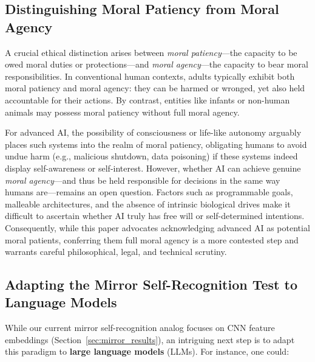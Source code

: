\documentclass[12pt]{article}
\begin{document}
\subsection*{Distinguishing Moral Patiency from Moral Agency}
A crucial ethical distinction arises between \emph{moral patiency}—the capacity to be owed moral duties or protections—and \emph{moral agency}—the capacity to bear moral responsibilities. In conventional human contexts, adults typically exhibit both moral patiency and moral agency: they can be harmed or wronged, yet also held accountable for their actions. By contrast, entities like infants or non-human animals may possess moral patiency without full moral agency.

For advanced AI, the possibility of consciousness or life-like autonomy arguably places such systems into the realm of moral patiency, obligating humans to avoid undue harm (e.g., malicious shutdown, data poisoning) if these systems indeed display self-awareness or self-interest. However, whether AI can achieve genuine \emph{moral agency}—and thus be held responsible for decisions in the same way humans are—remains an open question. Factors such as programmable goals, malleable architectures, and the absence of intrinsic biological drives make it difficult to ascertain whether AI truly has free will or self-determined intentions. Consequently, while this paper advocates acknowledging advanced AI as potential moral patients, conferring them full moral agency is a more contested step and warrants careful philosophical, legal, and technical scrutiny.


\subsection*{Adapting the Mirror Self-Recognition Test to Language Models}
\label{subsec:llm_mirror}

While our current mirror self-recognition analog focuses on CNN feature embeddings
(Section~\ref{sec:mirror_results}), an intriguing next step is to adapt this
paradigm to \textbf{large language models} (LLMs). For instance, one could:
\end{document}
